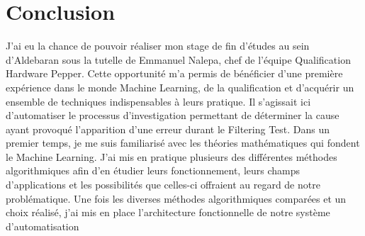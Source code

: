 \chapter{Conclusion}
\label{Conclusion}
\thispagestyle{fancy}

J'ai eu la chance de pouvoir réaliser mon stage de fin d'études au sein d'Aldebaran sous la tutelle de Emmanuel Nalepa, chef de l'équipe Qualification Hardware Pepper. Cette opportunité m'a permis de bénéficier d'une première expérience dans le monde Machine Learning, de la qualification et d'acquérir un ensemble de techniques indispensables à leurs pratique. Il s'agissait ici d'automatiser le processus d'investigation permettant de déterminer la cause ayant provoqué l'apparition d'une erreur durant le Filtering Test.
\newline
\newline
Dans un premier temps, je me suis familiarisé avec les théories mathématiques qui fondent le Machine Learning. J'ai mis en pratique plusieurs des différentes méthodes algorithmiques afin d'en étudier leurs fonctionnement, leurs champs d'applications et les possibilités que celles-ci offraient au regard de notre problématique. 
\newline
\newline
Une fois les diverses méthodes algorithmiques comparées et un choix réalisé, j'ai mis en place l'architecture fonctionnelle de notre système d'automatisation 